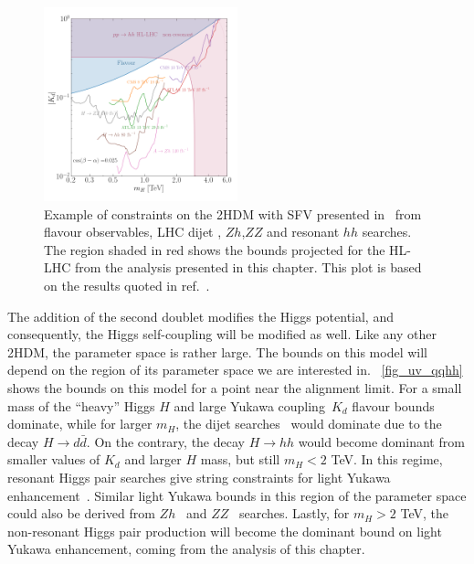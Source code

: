 \begin{figure}[!t]
	\centering
	\includegraphics[width = 0.5\textwidth]{./fig/2HDM-bound_full}
	\vspace{-0.5 cm}
	\caption{Example of constraints on the 2HDM with SFV presented in~\cite{Egana-Ugrinovic:2019dqu,Egana-Ugrinovic:2021uew} from flavour observables, LHC dijet , $Zh$,$ZZ$ and resonant $hh$ searches. The region shaded in red shows the bounds projected for the HL-LHC from the analysis presented in this chapter. This plot is based on the results quoted in ref.~\cite{Egana-Ugrinovic:2021uew}. } %
	\label{fig_uv_qqhh}
\end{figure}
\par The addition of the second doublet modifies the Higgs potential, and consequently, the Higgs self-coupling will be modified as well.  Like any other 2HDM, the parameter space is rather large. The bounds on this model will depend on the region of its parameter space we are interested in.  ~\autoref{fig_uv_qqhh} shows the bounds on this model for a point near the alignment limit. For a small mass of the ``heavy'' Higgs $H$ and large Yukawa coupling~$K_d$ flavour bounds dominate, while for larger $m_H$, the dijet searches~\cite{Aaboud:2019zxd,Aad:2019hjw,Sirunyan:2019vgj}  would dominate due to the decay $ H \to d \bar d$.  On the contrary, the decay $ H \to hh$ would become dominant from smaller values of $K_d$ and larger $H$ mass, but still $ m_H < 2$ TeV. In this regime, resonant Higgs pair searches give string constraints for light Yukawa enhancement~\cite{Sirunyan:2018ayu, Aad:2019uzh}. Similar  light Yukawa bounds in this region of the parameter space could also be derived from  $Zh$~\cite{ATLAS:2020pgp} and $ZZ$~\cite{Aad:2020fpj, Sirunyan:2018qlb} searches.  Lastly, for $ m_H > 2$ TeV, the non-resonant Higgs pair production will become the dominant bound on light Yukawa enhancement, coming from the analysis of this chapter.  


